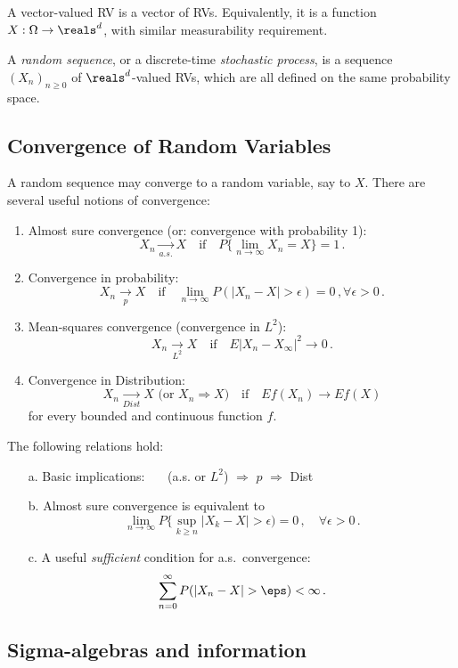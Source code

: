 A vector-valued RV is a vector of RVs. Equivalently, it is a
function $X:\Omega \to \reals^d$, with similar measurability requirement.

A {\em random sequence}, or a discrete-time {\em stochastic process},
is a sequence $(X_n)_{n\ge 0}$ of
$\reals^d$-valued RVs, which are all defined on the same probability space.

\subsection{Convergence of Random Variables}

A random sequence may converge to a random variable, say to $X$.
There are several useful notions of convergence:
\begin{enumerate}
\item
Almost sure convergence (or: convergence with probability 1):
$$
X_n \xrightarrow[a.s.]{} X  \quad \text{if} \quad P \{\lim_{n\to\infty} X_n =X \} = 1 \,.
$$
\item
Convergence in probability:
$$
X_n \xrightarrow[p]{} X \quad \text{if} \quad
\lim_{n\to\infty} P (|X_n - X| > \epsilon) =0\,,
\forall \epsilon >0\,.
$$
\item
Mean-squares convergence (convergence in $L^2$):
$$
 X_n \xrightarrow[L^2]{} X
\quad \text{if} \quad
E |X_n - X_\infty|^2 \to 0 \,.$$
\item
Convergence in Distribution:
$$ \text{$X_n \xrightarrow[Dist]{} X$ (or $X_n \Rightarrow X$)}
\quad \text{if} \quad
Ef(X_n) \to Ef(X)$$
for every bounded and continuous function $f$.
\end{enumerate}

\medskip

The following relations hold:
\begin{itemize}
\item[a.]
Basic implications: \ \ \
(a.s. or $L^2$) $\Longrightarrow$ $p$ $\Longrightarrow$ Dist
\item[b.]
Almost sure convergence is equivalent to
$$
\lim_{n\to\infty} P \{\sup_{k\geq n} |X_k - X| > \epsilon) = 0 \,,
\quad \forall \epsilon >0\,.
$$
\item[c.] A useful {\em sufficient} condition for a.s.\  convergence:
$$
\sum_{n=0}^{\infty} P(|X_n-X| > \eps) < \infty \,.
$$
\end{itemize}

\subsection{Sigma-algebras and information}

